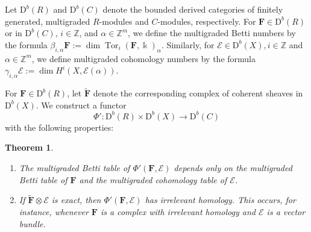 \documentclass[12pt]{amsart}
\newtheorem{theorem}[lemma]{Theorem}
\theoremstyle{definition}
\theoremstyle{remark}
\newcommand{\Tor}{\operatorname{Tor}}
\newcommand{\kk}{\Bbbk}
\newcommand{\ZZ}{\mathbb{Z}}
\newcommand{\cE}{\mathcal{E}}
\newcommand{\FF}{\mathbf{F}}
\newcommand{\DD}{\mathrm{D}}
\begin{document}
Let $\DD^b(R)$ and $\DD^b(C)$ denote the bounded derived categories of finitely generated, multigraded $R$-modules and $C$-modules, respectively.   For $\FF\in \DD^b(R)$ or in $\DD^b(C)$, $i\in \ZZ$, and $\alpha\in \ZZ^m$, we define the multigraded Betti numbers by the formula $\beta_{i,\alpha} \FF:=\dim \Tor_i(\FF,\kk)_{\alpha}$.  Similarly, for $\cE\in \DD^b(X), i\in \ZZ$ and $\alpha\in \ZZ^m$, we define multigraded cohomology numbers by the formula $\gamma_{i,\alpha} \cE:=\dim H^i(X, \cE(\alpha))$.  


For  $\FF\in \DD^b(R)$, let $\widetilde{\FF}$ denote the corresponding complex of coherent sheaves in $\DD^b(X)$.  We construct a functor
\[
\Phi': \DD^b(R)\times \DD^b(X)\to \DD^b(C)
\]
with the following properties:
\begin{theorem}\label{thm:Phimulti}
\begin{enumerate}
	\item\label{thm:Phi':1}  The multigraded Betti table of $\Phi'(\FF,\cE)$ depends only on the multigraded Betti table of $\FF$ and the multigraded cohomology table of $\cE$.
	\item\label{thm:Phi':2}  If $\widetilde{\FF}\otimes \cE$ is exact, then $\Phi'(\FF,\cE)$ has irrelevant homology.  This occurs, for instance, whenever $\FF$ is a complex with irrelevant homology and $\cE$ is a vector bundle.
\end{enumerate}
\end{theorem}
\end{document}
